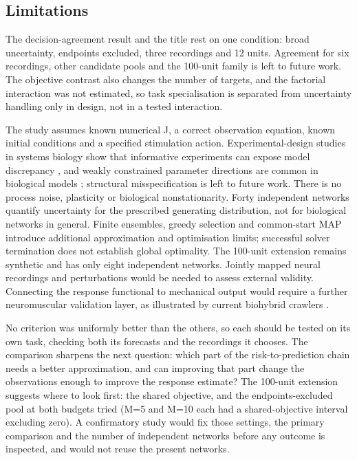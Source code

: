 \subsection{Limitations}

The decision-agreement result and the title rest on one condition: broad uncertainty, endpoints excluded, three recordings and 12 units. Agreement for six recordings, other candidate pools and the 100-unit family is left to future work. The objective contrast also changes the number of targets, and the factorial interaction was not estimated, so task specialisation is separated from uncertainty handling only in design, not in a tested interaction.

The study assumes known numerical J, a correct observation equation, known initial conditions and a specified stimulation action. Experimental-design studies in systems biology show that informative experiments can expose model discrepancy \cite{ref13}, and weakly constrained parameter directions are common in biological models \cite{ref29}; structural misspecification is left to future work. There is no process noise, plasticity or biological nonstationarity. Forty independent networks quantify uncertainty for the prescribed generating distribution, not for biological networks in general. Finite ensembles, greedy selection and common-start MAP introduce additional approximation and optimisation limits; successful solver termination does not establish global optimality. The 100-unit extension remains synthetic and has only eight independent networks. Jointly mapped neural recordings and perturbations would be needed to assess external validity. Connecting the response functional to mechanical output would require a further neuromuscular validation layer, as illustrated by current biohybrid crawlers \cite{ref02,ref27}.

No criterion was uniformly better than the others, so each should be tested on its own task, checking both its forecasts and the recordings it chooses. The comparison sharpens the next question: which part of the risk-to-prediction chain needs a better approximation, and can improving that part change the observations enough to improve the response estimate? The 100-unit extension suggests where to look first: the shared objective, and the endpoints-excluded pool at both budgets tried (M=5 and M=10 each had a shared-objective interval excluding zero). A confirmatory study would fix those settings, the primary comparison and the number of independent networks before any outcome is inspected, and would not reuse the present networks.

